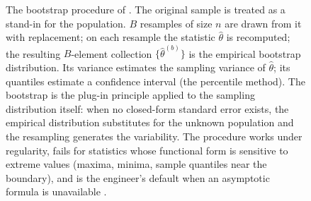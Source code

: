 \begin{figure}[p]
\caption[The bootstrap as a plug-in approximation to the sampling
distribution]{The bootstrap procedure of \textcite{paper:v2ch14-efron-bootstrap-1979}.
The original sample is treated as a stand-in for the population.
$B$ resamples of size $n$ are drawn from it with replacement; on
each resample the statistic $\hat{\theta}$ is recomputed; the
resulting $B$-element collection $\{\hat{\theta}^{(b)}\}$ is the
empirical bootstrap distribution. Its variance estimates the
sampling variance of $\hat{\theta}$; its quantiles estimate a
confidence interval (the percentile method). The bootstrap is the
plug-in principle applied to the sampling distribution itself: when
no closed-form standard error exists, the empirical distribution
substitutes for the unknown population and the resampling generates
the variability. The procedure works under regularity, fails for
statistics whose functional form is sensitive to extreme values
(maxima, minima, sample quantiles near the boundary), and is the
engineer's default when an asymptotic formula is unavailable
\cite{paper:ch08-efron-tibshirani-1993}.}
\label{fig:vol02:ch14:bootstrap}
\end{figure}
